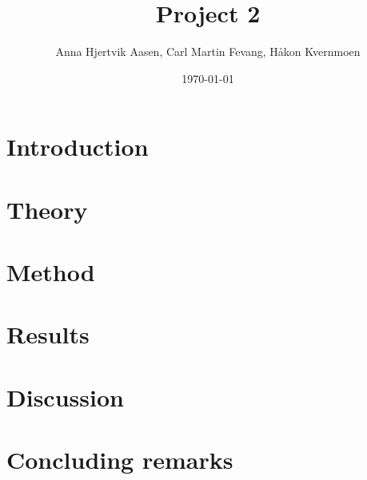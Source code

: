 \documentclass[twocolumn,english,notitlepage]{article}
\title{Project 2}
\author{Anna Hjertvik Aasen, Carl Martin Fevang, Håkon Kvernmoen}
\date{\today}
\begin{document}


\section{Introduction}


\section{Theory}


\section{Method}


\section{Results}


\section{Discussion}


\section{Concluding remarks}


\renewcommand{\theequation}{\thesection.\arabic{equation}}
\begin{appendices}
     
\end{appendices}

\printbibliography
\end{document}
